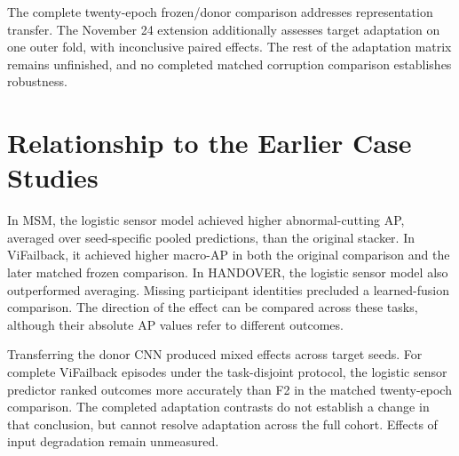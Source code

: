 The complete twenty-epoch frozen/donor comparison addresses representation transfer. The
November 24 extension additionally assesses target adaptation on one outer fold, with
inconclusive paired effects. The rest of the adaptation matrix remains unfinished, and
no completed matched corruption comparison establishes robustness.

\section{Relationship to the Earlier Case Studies}
In MSM, the logistic sensor model achieved higher abnormal-cutting AP, averaged over
seed-specific pooled predictions, than the original stacker. In ViFailback, it achieved
higher macro-AP in both the original comparison and the later matched frozen comparison.
In HANDOVER, the logistic sensor model also outperformed averaging. Missing participant
identities precluded a learned-fusion comparison. The direction of the effect can be
compared across these tasks, although their absolute AP values refer to different
outcomes.

Transferring the donor CNN produced mixed effects across target seeds. For complete
ViFailback episodes under the task-disjoint protocol, the logistic sensor predictor
ranked outcomes more accurately than F2 in the matched twenty-epoch comparison. The
completed adaptation contrasts do not establish a change in that conclusion, but cannot
resolve adaptation across the full cohort. Effects of input degradation remain
unmeasured.
